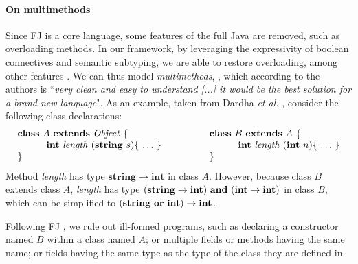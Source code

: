 \paragraph{On multimethods}
Since FJ is a core language, some features of the full Java are removed, such as overloading methods.
In our framework, by leveraging the expressivity of boolean connectives and semantic subtyping, we are able to restore overloading, among other features \cite[\S 8.4]{Dardha2017}.
We can thus model \emph{multimethods}, \cite{BC97}, which according to the authors is ``\emph{very clean and easy to understand [...] it would be the best solution for a brand new language}".
As an example, taken from Dardha \emph{et al.}  \cite{Dardha2013,Dardha2017}, consider the following class declarations:
$$
\begin{array}{ll}
\mathbf{class} \  A \ \mathbf{extends }\  \mathit{Object}\ \{
&
\qquad
\mathbf{class} \  B \ \mathbf{extends }\  A\ \{
\\
	\qquad\quad \mathbf{int}\ \mathit{length}\ (\mathbf{string}\ s)\{\ \ldots\ \}\qquad
&
	\qquad\qquad\quad \mathbf{int}\ \mathit{length}\ (\mathbf{int}\ n)\{\ \ldots\ \}
\\
\}
&
\qquad \}
\end{array}
$$
Method {\it length} has type $\mathbf{string} \rightarrow \mathbf{int}$ in class $A$.
However, because class $B$ extends class $A$,  {\it length} has type $(\mathbf{string} \rightarrow \mathbf{int})\ \mathbf{and}\ (\mathbf{int} \rightarrow \mathbf{int})$ in class $B$,
which can be simplified to $(\mathbf{string}\ \mathbf{or}\ \mathbf{int}) \rightarrow \mathbf{int}$.

Following FJ \cite{featherweight}, we rule out ill-formed programs, such as declaring a constructor named $B$ within a class named $A$; or multiple fields or methods having the same name; or fields having the same type as the type of the class they are defined in.



